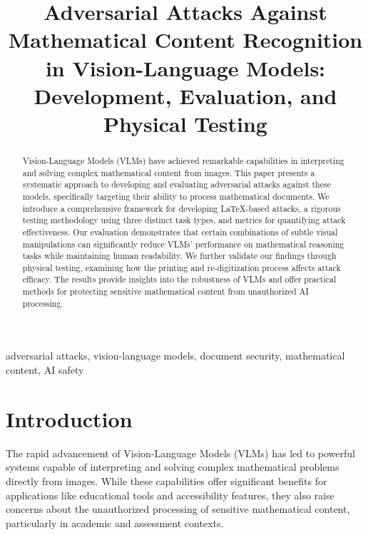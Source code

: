 \documentclass[conference]{IEEEtran}
\begin{document}
\title{Adversarial Attacks Against Mathematical Content Recognition in Vision-Language Models: Development, Evaluation, and Physical Testing}

\author{
}

\maketitle

\begin{abstract}
Vision-Language Models (VLMs) have achieved remarkable capabilities in interpreting and solving complex mathematical content from images. This paper presents a systematic approach to developing and evaluating adversarial attacks against these models, specifically targeting their ability to process mathematical documents. We introduce a comprehensive framework for developing LaTeX-based attacks, a rigorous testing methodology using three distinct task types, and metrics for quantifying attack effectiveness. Our evaluation demonstrates that certain combinations of subtle visual manipulations can significantly reduce VLMs' performance on mathematical reasoning tasks while maintaining human readability. We further validate our findings through physical testing, examining how the printing and re-digitization process affects attack efficacy. The results provide insights into the robustness of VLMs and offer practical methods for protecting sensitive mathematical content from unauthorized AI processing.
\end{abstract}

\begin{IEEEkeywords}
adversarial attacks, vision-language models, document security, mathematical content, AI safety
\end{IEEEkeywords}

\section{Introduction}
The rapid advancement of Vision-Language Models (VLMs) has led to powerful systems capable of interpreting and solving complex mathematical problems directly from images. While these capabilities offer significant benefits for applications like educational tools and accessibility features, they also raise concerns about the unauthorized processing of sensitive mathematical content, particularly in academic and assessment contexts.
\end{document}

